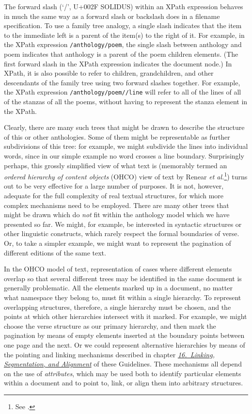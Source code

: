 The forward slash (‘/’, U+002F SOLIDUS) within an XPath expression behaves in much the same way as a forward slash or backslash does in a filename specification. To use a family tree analogy, a single slash indicates that the item to the immediate left is a parent of the item(s) to the right of it. For example, in the XPath expression \texttt{/anthology/poem}, the single slash between anthology and poem indicates that anthology is a parent of the poem children elements. (The first forward slash in the XPath expression indicates the document node.) In XPath, it is also possible to refer to children, grandchildren, and other descendants of the family tree using two forward slashes together. For example, the XPath expression \texttt{/anthology/poem//line} will refer to all of the lines of all of the stanzas of all the poems, without having to represent the stanza element in the XPath.\par
Clearly, there are many such trees that might be drawn to describe the structure of this or other anthologies. Some of them might be representable as further subdivisions of this tree: for example, we might subdivide the lines into individual words, since in our simple example no word crosses a line boundary. Surprisingly perhaps, this grossly simplified view of what text is (memorably termed an \textit{ordered hierarchy of content objects} (OHCO) view of text by Renear \textit{et al.}\footnote{See \cite{SG-BIBL-2}.}) turns out to be very effective for a large number of purposes. It is not, however, adequate for the full complexity of real textual structures, for which more complex mechanisms need to be employed. There are many other trees that might be drawn which do \textit{not} fit within the anthology model which we have presented so far. We might, for example, be interested in syntactic structures or other linguistic constructs, which rarely respect the formal boundaries of verse. Or, to take a simpler example, we might want to represent the pagination of different editions of the same text.\par
In the OHCO model of text, representation of cases where different elements overlap so that several different trees may be identified in the same document is generally problematic. All the elements marked up in a document, no matter what namespace they belong to, must fit within a single hierarchy. To represent overlapping structures, therefore, a single hierarchy must be chosen, and the points at which other hierarchies intersect with it marked. For example, we might choose the verse structure as our primary hierarchy, and then mark the pagination by means of empty elements inserted at the boundary points between one page and the next. Or we could represent alternative hierarchies by means of the pointing and linking mechanisms described in chapter \textit{\hyperref[SA]{16.\ Linking, Segmentation, and Alignment}} of these Guidelines. These mechanisms all depend on the use of \textit{attributes}, which may be used both to identify particular elements within a document and to point to, link, or align them into arbitrary structures.
